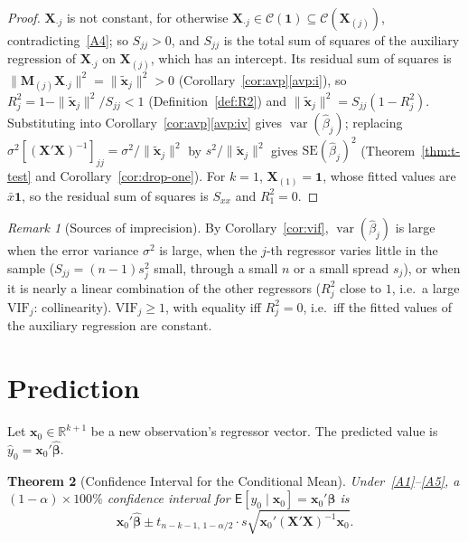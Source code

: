 \documentclass[14pt]{extarticle}
\theoremstyle{plain}
\newtheorem{theorem}{Theorem}[section]
\theoremstyle{definition}
\theoremstyle{remark}
\newtheorem{remark}[theorem]{Remark}
\newcommand\expc{\mathsf{E}}
\DeclareMathOperator\var{var}
\newcommand{\SE}{\mathrm{SE}}
\newcommand{\bX}{\mathbf{X}}
\newcommand{\bx}{\mathbf{x}}
\def\bb{\boldsymbol{\beta}}
\newcommand{\bM}{\mathbf{M}}
\newcommand{\bone}{\mathbf{1}}
\newcommand{\Real}{\mathbb{R}}
\newcommand{\calC}{\mathcal{C}}
\newcommand{\VIF}{\mathrm{VIF}}
\begin{document}
\begin{proof}
$\bX_{\cdot j}$ is not constant, for otherwise $\bX_{\cdot j} \in \calC(\bone) \subseteq \calC(\bX_{(j)})$, contradicting~\ref{A4}; so $S_{jj} > 0$, and $S_{jj}$ is the total sum of squares of the auxiliary regression of $\bX_{\cdot j}$ on $\bX_{(j)}$, which has an intercept. Its residual sum of squares is $\|\bM_{(j)}\bX_{\cdot j}\|^2 = \|\tilde{\bx}_j\|^2 > 0$ (Corollary~\ref{cor:avp}\ref{avp:i}), so $R_j^2 = 1 - \|\tilde{\bx}_j\|^2/S_{jj} < 1$ (Definition~\ref{def:R2}) and $\|\tilde{\bx}_j\|^2 = S_{jj}(1 - R_j^2)$. Substituting into Corollary~\ref{cor:avp}\ref{avp:iv} gives $\var(\hat\beta_j)$; replacing $\sigma^2[(\bX'\bX)^{-1}]_{jj} = \sigma^2/\|\tilde{\bx}_j\|^2$ by $s^2/\|\tilde{\bx}_j\|^2$ gives $\SE(\hat\beta_j)^2$ (Theorem~\ref{thm:t-test} and Corollary~\ref{cor:drop-one}). For $k = 1$, $\bX_{(1)} = \bone$, whose fitted values are $\bar x\bone$, so the residual sum of squares is $S_{xx}$ and $R_1^2 = 0$.
\end{proof}

\begin{remark}[Sources of imprecision]\label{rem:imprecision}
By Corollary~\ref{cor:vif}, $\var(\hat\beta_j)$ is large when the error variance $\sigma^2$ is large, when the $j$-th regressor varies little in the sample ($S_{jj} = (n-1)s_j^2$ small, through a small $n$ or a small spread $s_j$), or when it is nearly a linear combination of the other regressors ($R_j^2$ close to $1$, i.e.\ a large $\VIF_j$: collinearity). $\VIF_j \geqslant 1$, with equality iff $R_j^2 = 0$, i.e.\ iff the fitted values of the auxiliary regression are constant.
\end{remark}

\section{Prediction}\label{sec:pred}

Let $\bx_0 \in \Real^{k+1}$ be a new observation's regressor vector. The predicted value is $\hat{y}_0 = \bx_0'\hat{\bb}$.

\begin{theorem}[Confidence Interval for the Conditional Mean]\label{thm:ci-mean}
Under~\ref{A1}--\ref{A5}, a $(1-\alpha) \times 100\%$ confidence interval for $\expc[y_0 \mid \bx_0] = \bx_0'\bb$ is
\begin{equation}
\bx_0'\hat{\bb} \pm t_{n-k-1,\,1-\alpha/2} \cdot s\sqrt{\bx_0'(\bX'\bX)^{-1}\bx_0}.
\end{equation}
\end{theorem}
\end{document}
